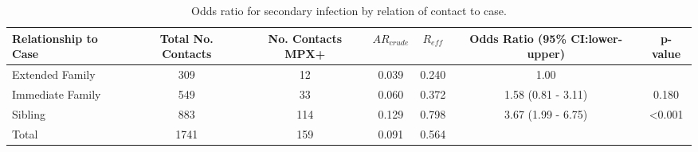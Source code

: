 
\begin{table}
\centering
    \caption{Odds ratio for secondary infection by relation of contact to case.}
    \begin{tabular}{@{}lcccccc@{}}
    \toprule
    Relationship to Case & Total No. Contacts  & No. Contacts MPX+ & $AR_{crude}$ & $R_{eff}$ & Odds Ratio (95\% CI:lower-upper)  & p-value \\
    \midrule
  Extended Family   &  309   &   12   & 0.039 & 0.240 & 1.00               &  ~ \\
  Immediate Family  &  549   &   33   & 0.060 & 0.372 & 1.58 (0.81 - 3.11) & 0.180 \\
  Sibling           &  883   &   114  & 0.129 & 0.798 & 3.67 (1.99 - 6.75) & \textless0.001 \\
  Total             &  1741  &   159  & 0.091 & 0.564 & ~                 & ~ \\
    \bottomrule
    \end{tabular}
\end{table}

